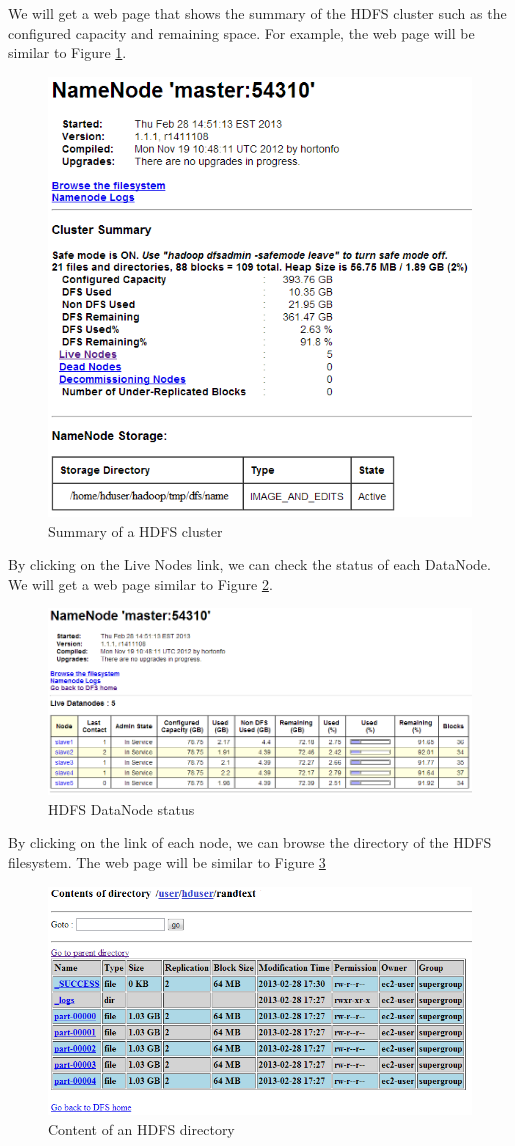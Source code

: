 We will get a web page that shows the summary of the HDFS cluster such as the configured capacity and remaining space. For example, the web page will be similar to Figure \ref{fig:hdfs.summary}.
\begin{figure}[h]
  \centering
  \includegraphics[width=.7\textwidth]{figs/5163os_04_08.png}
  \caption{Summary of a HDFS cluster}\label{fig:hdfs.summary}
\end{figure} 

By clicking on the Live Nodes link, we can check the status of each DataNode. We will get a web page similar to Figure \ref{fig:datanode.status}.
\begin{figure}[h]
  \centering
  \includegraphics[width=.9\textwidth]{figs/5163os_04_09.png}
  \caption{HDFS DataNode status}\label{fig:datanode.status}
\end{figure} 

By clicking on the link of each node, we can browse the directory of the HDFS filesystem. The web page will be similar to Figure \ref{fig:content.hdfs}
\begin{figure}[h]
  \centering
  \includegraphics[width=.8\textwidth]{figs/5163os_04_10.png}
  \caption{Content of an HDFS directory}\label{fig:content.hdfs}
\end{figure} 

